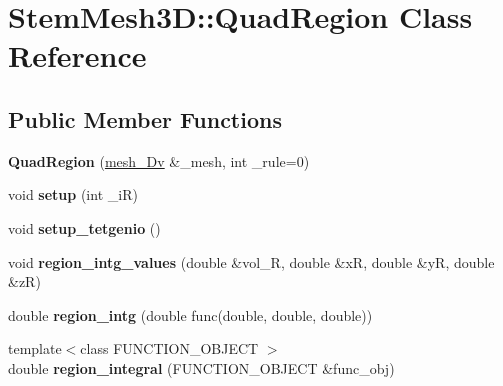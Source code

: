 \hypertarget{classStemMesh3D_1_1QuadRegion}{}\section{Stem\+Mesh3D\+:\+:Quad\+Region Class Reference}
\label{classStemMesh3D_1_1QuadRegion}
\subsection*{Public Member Functions}
\begin{DoxyCompactItemize}
\item 
\mbox{\label{classStemMesh3D_1_1QuadRegion_a561cd08cd2430d205ce0dddefc967f0f}} 
{\bfseries Quad\+Region} (\hyperlink{classStemMesh3D_1_1mesh__3Dv}{mesh\+\_\+Dv} \&\+\_\+mesh, int \+\_\+rule=0)
\item 
\mbox{\label{classStemMesh3D_1_1QuadRegion_a865123e616e3661727dbcfd05f249c64}} 
void {\bfseries setup} (int \+\_\+iR)
\item 
\mbox{\label{classStemMesh3D_1_1QuadRegion_a4d7ff91015551a159f3a06458d4f915d}} 
void {\bfseries setup\+\_\+tetgenio} ()
\item 
\mbox{\label{classStemMesh3D_1_1QuadRegion_aa669969c5ab1f32b79c170bbfa4fff0e}} 
void {\bfseries region\+\_\+intg\+\_\+values} (double \&vol\+\_\+R, double \&xR, double \&yR, double \&zR)
\item 
\mbox{\label{classStemMesh3D_1_1QuadRegion_ab93715c2cec77bb4bbb66e33582c58a2}} 
double {\bfseries region\+\_\+intg} (double func(double, double, double))
\item 
\mbox{\label{classStemMesh3D_1_1QuadRegion_a00bb9d3b1281205987b9c7fe313adfd1}} 
{\footnotesize template$<$class F\+U\+N\+C\+T\+I\+O\+N\+\_\+\+O\+B\+J\+E\+CT $>$ }\\double {\bfseries region\+\_\+integral} (F\+U\+N\+C\+T\+I\+O\+N\+\_\+\+O\+B\+J\+E\+CT \&func\+\_\+obj)
\item 
\mbox{\label{classStemMesh3D_1_1QuadRegion_a8a765eb6c1524bb2d7cb40e8397e42bc}} 

\end{DoxyCompactItemize}
